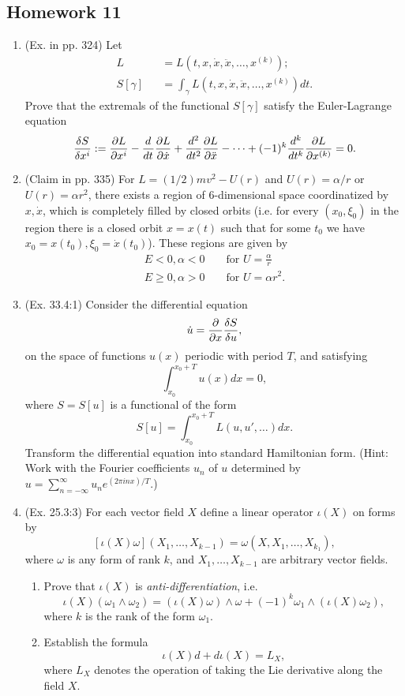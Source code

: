 \subsection{Homework 11}
\begin{enumerate}
	\item (Ex. in pp. 324) Let
	\begin{eqnarray}
	L &&= L(t, x, \dot{x}, \ddot{x}, \dots, x^{(k)});
	\nonumber\\
	S[\gamma] &&= \int_{\gamma} L(t, x, \dot{x}, \ddot{x}, \dots, x^{(k)}) dt.
	\end{eqnarray}
	Prove that the extremals of the functional $S[\gamma]$ satisfy the Euler-Lagrange equation
	\begin{eqnarray}
		\frac{\delta S}{\delta x^i} := \pardiff{L}{x^i} - \diff{}{t}\pardiff{L}{\dot{x}} + \diff[2]{ }{t} \pardiff{L}{\ddot{x}} - \cdots + (-1)^k \diff[k]{ }{t} \pardiff{L}{x^{(k)}} = 0.
	\end{eqnarray}
	
	\item (Claim in pp. 335) For $L = (1/2)mv^2 - U(r)$ and $U(r) = \alpha/r$ or $U(r) = \alpha r^2$, there exists a region of 6-dimensional space coordinatized by $x, \dot{x}$, which is completely filled by closed orbits (i.e. for every $(x_0, \xi_0)$ in the region there is a closed orbit $x = x(t)$ such that for some $t_0$ we have $x_0 = x(t_0), \xi_0 = \dot{x}(t_0)$). These regions are given by
	\begin{eqnarray}
		E < 0, \alpha < 0&& \text{ for } U = \frac{\alpha}{r}
		\nonumber\\
		E \geq 0, \alpha > 0 && \text{ for } U = \alpha r^2.
		\nonumber 
	\end{eqnarray}
	
	\item (Ex. 33.4:1) Consider the differential equation \[ \dot{u} = \pardiff{ }{x} \frac{\delta S}{\delta u}, \] on the space of functions $u(x)$ periodic with period $T$, and satisfying \[ \int_{x_0}^{x_0+T} u(x) dx = 0, \] where $S = S[u]$ is a functional of the form \[ S[u] = \int_{x_0}^{x_0+T} L(u, u', \dots) dx. \] Transform the differential equation into standard Hamiltonian form. (Hint: Work with the Fourier coefficients $u_n$ of $u$ determined by $u = \sum_{n = -\infty}^{\infty} u_n e^{(2 \pi i n x)/T} $.)
	
	\item (Ex. 25.3:3) For each vector field $X$ define a linear operator $\iota(X)$ on forms by
	\[ [\iota(X)\omega](X_1, \dots, X_{k-1}) = \omega(X, X_1, \dots, X_{k_1}), \] where $\omega$ is any form of rank $k$, and $X_1, \dots, X_{k-1}$ are arbitrary vector fields.
	\begin{enumerate}
		\item Prove that $\iota(X)$ is \emph{anti-differentiation}, i.e.
		\[ \iota(X)(\omega_1 \wedge \omega_2) = (\iota(X)\omega) \wedge \omega + (-1)^k \omega_1 \wedge (\iota(X)\omega_2), \]
		where $k$ is the rank of the form $\omega_1$.
		\item Establish the formula \[ \iota(X)d + d \iota(X) = L_X, \] where $L_X$ denotes the operation of taking the Lie derivative along the field $X$.
	\end{enumerate}
\end{enumerate}


